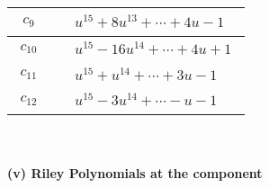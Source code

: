 \documentclass[1p]{elsarticle_modified}
\theoremstyle{definition}
\begin{document}
\begin{tabular}{m{50pt}|m{274pt}}
\hline $$\begin{aligned}c_{9}\end{aligned}$$&$\begin{aligned}
&u^{15}+8 u^{13}+\cdots+4 u-1
\end{aligned}$\\
\hline $$\begin{aligned}c_{10}\end{aligned}$$&$\begin{aligned}
&u^{15}-16 u^{14}+\cdots+4 u+1
\end{aligned}$\\
\hline $$\begin{aligned}c_{11}\end{aligned}$$&$\begin{aligned}
&u^{15}+u^{14}+\cdots+3 u-1
\end{aligned}$\\
\hline $$\begin{aligned}c_{12}\end{aligned}$$&$\begin{aligned}
&u^{15}-3 u^{14}+\cdots- u-1
\end{aligned}$\\
\hline
\end{tabular}\\~\\
\newpage\renewcommand{\arraystretch}{1}
\flushleft \textbf{(v) Riley Polynomials at the component}\newline \\
\end{document}
